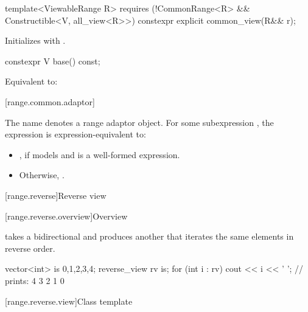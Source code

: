 %
\begin{itemdecl}
template<ViewableRange R>
  requires (!CommonRange<R> && Constructible<V, all_view<R>>)
constexpr explicit common_view(R&& r);
\end{itemdecl}

\begin{itemdescr}
\pnum
\effects Initializes  with .
\end{itemdescr}

%
\begin{itemdecl}
constexpr V base() const;
\end{itemdecl}

\begin{itemdescr}
\pnum
\effects Equivalent to: 
\end{itemdescr}

[range.common.adaptor]{}

\pnum
The name  denotes a
range adaptor object.
For some subexpression ,
the expression  is expression-equivalent to:

\begin{itemize}
\item {},
  if  models 
  and  is a well-formed expression.

\item Otherwise, .
\end{itemize}


[range.reverse]{Reverse view}

[range.reverse.overview]{Overview}

\pnum
{} takes a bidirectional  and produces
another  that iterates the same elements in reverse order.

\pnum
\begin{example}
\begin{codeblock}
vector<int> is {0,1,2,3,4};
reverse_view rv {is};
for (int i : rv)
  cout << i << ' '; // prints: 4 3 2 1 0
\end{codeblock}
\end{example}

[range.reverse.view]{Class template }

